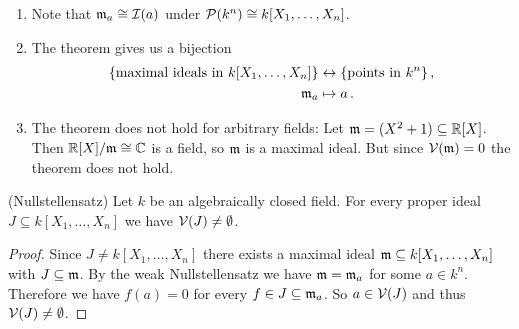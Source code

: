 \begin{remark}
  \begin{enumerate}[label=\emph{\alph*)},leftmargin=*]
    \item
      Note that $\mathfrak{m}_{a} \cong \mathcal{I}(a)$ under $\mathcal{P}(k^n) \cong k[X_1, \dotsc, X_n]$.
    \item
      The theorem gives us a bijection
      \begin{align*}
                          \{\text{maximal ideals in $k[X_1, \dotsc, X_n]$}\}
        &\leftrightarrow  \{\text{points in $k^n$}\} \,,  \\
                          \mathfrak{m}_a
        &\mapsto          a \,.
      \end{align*}
    \item
      The theorem does not hold for arbitrary fields:
      Let \mbox{$\mathfrak{m} = (X^2 + 1) \subseteq \mathbb{R}[X]$}.
      Then $\mathbb{R}[X]/\mathfrak{m} \cong \mathbb{C}$ is a field, so $\mathfrak{m}$ is a maximal ideal.
      But since $\mathcal{V}(\mathfrak{m}) = 0$ the theorem does not hold.
  \end{enumerate}
\end{remark}


\begin{corollary}(Nullstellensatz)
  Let $k$ be an algebraically closed field.
  For every proper ideal $J \subseteq k[X_1, \dotsc, X_n]$ we have $\mathcal{V}(J) \neq \emptyset$.
\end{corollary}
\begin{proof}
  Since $J \neq k[X_1, \dotsc, X_n]$ there exists a maximal ideal $\mathfrak{m} \subseteq k[X_1, \dotsc, X_n]$ with $J \subseteq \mathfrak{m}$.
  By the weak Nullstellensatz we have $\mathfrak{m} = \mathfrak{m}_a$ for some $a \in k^n$.
  Therefore we have $f(a) = 0$ for every $f \in J \subseteq \mathfrak{m}_a$.
  So $a \in \mathcal{V}(J)$ and thus $\mathcal{V}(J) \neq \emptyset$.
\end{proof}


